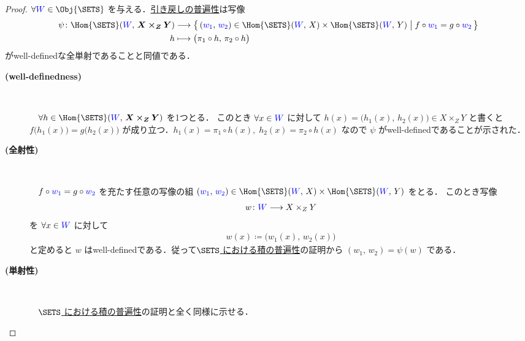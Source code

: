 \documentclass[geometry_main]{subfiles}
\begin{document}
\begin{proof}
	$\forall \textcolor{blue}{W} \in \Obj{\SETS}$ を与える．\hyperref[cmtd:pullback]{引き戻しの普遍性}は写像
	\begin{align}
		\psi \colon \Hom{\SETS} (\textcolor{blue}{W},\, \bm{X \times_Z Y}) &\lto \bigl\{\, (\textcolor{blue}{w_1},\, \textcolor{blue}{w_2}) \in \Hom{\SETS}(\textcolor{blue}{W},\, X) \times \Hom{\SETS}(\textcolor{blue}{W},\, Y) \bigm| f \circ \textcolor{blue}{w_1} = g \circ \textcolor{blue}{w_2} \,\bigr\} \\
		h &\lmto \bigl( \pi_1 \circ h,\, \pi_2 \circ h\bigr) 
	\end{align}
	がwell-definedな全単射であることと同値である．
	\begin{description}
		\item[\textbf{(well-definedness)}] 　
		
		　$\forall h \in \Hom{\SETS} (\textcolor{blue}{W},\, \bm{X \times_Z Y})$ を1つとる．
		このとき $\forall x \in \textcolor{blue}{W}$ に対して
		$h(x) = \bigl( h_1(x),\, h_2(x) \bigr) \in X \times_Z Y$ と書くと
		$f \bigl( h_1(x) \bigr) = g \bigl( h_2(x) \bigr)$ が成り立つ．$h_1(x) = \pi_1 \circ h(x),\; h_2(x) = \pi_2 \circ h(x)$ なので $\psi$ がwell-definedであることが示された．

		\item[\textbf{(全射性)}] 　
		
		　$f \circ \textcolor{blue}{w_1} = g \circ \textcolor{blue}{w_2}$ を充たす任意の写像の組 $(\textcolor{blue}{w_1},\, \textcolor{blue}{w_2}) \in \Hom{\SETS}(\textcolor{blue}{W},\, X) \times \Hom{\SETS}(\textcolor{blue}{W},\, Y)$ をとる．
		このとき写像
		\begin{align}
			w \colon \textcolor{blue}{W} \longrightarrow X \times_Z Y
		\end{align}
		を $\forall x \in \textcolor{blue}{W}$ に対して
		\begin{align}
			w(x) \coloneqq \bigl( w_1(x),\, w_2(x) \bigr) 
		\end{align}
		と定めると $w$ はwell-definedである．従って\hyperref[prop:product-sets]{$\SETS$ における積の普遍性}の証明から $(w_1,\, w_2) = \psi(w)$ である．

		\item[\textbf{(単射性)}] 　
		
		　\hyperref[prop:product-sets]{$\SETS$ における積の普遍性}の証明と全く同様に示せる．
	\end{description}
\end{proof}
\end{document}
